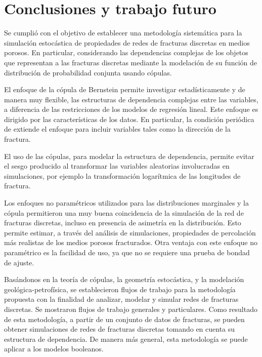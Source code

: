 
\chapter{Conclusiones y trabajo futuro}
\label{ch:conclusiones}

Se cumpli\'o con el objetivo de  establecer una metodolog\'ia sistem\'atica para la simulaci\'on estoc\'astica de propiedades de redes de fracturas discretas en medios porosos.
En particular, considerando las dependencias complejas de los objetos que representan a las fracturas discretas mediante la modelaci\'on de su funci\'on de distribuci\'on de probabilidad conjunta usando c\'opulas.

El enfoque de la c\'opula de Bernstein permite investigar estad\'isticamente y de manera muy flexible, las estructuras de dependencia complejas  entre las variables, a diferencia de las restricciones de los modelos de regresi\'on lineal. Este enfoque es dirigido por las caracter\'isticas de los datos. 
En particular, la condici\'on peri\'odica de \citeauthor{carnicero_non-parametric_2013} extiende el enfoque para incluir variables tales como la direcci\'on de la fractura.

El uso de las c\'opulas, para modelar la estructura de dependencia, permite evitar el sesgo producido al transformar las variables aleatorias involucradas en simulaciones, por ejemplo la transformaci\'on logar\'itmica de las longitudes de fractura.

Los enfoques no param\'etricos utilizados para las distribuciones marginales y la c\'opula permitieron una muy buena coincidencia de la simulaci\'on de la red de fracturas discretas, incluso en presencia de asimetr\'ia en la distribuci\'on. Esto permite estimar, a trav\'es del an\'alisis de simulaciones, propiedades de percolaci\'on m\'as realistas de los medios porosos fracturados. Otra ventaja con este enfoque no param\'etrico es la facilidad de uso, ya que no se requiere una prueba de bondad de ajuste.

Bas\'andonos en la teor\'ia de c\'opulas, la geometr\'ia estoc\'astica, y la modelaci\'on geol\'ogica-petrof\'isica, se establecieron flujos de trabajo para la metodolog\'ia propuesta con la finalidad de analizar, modelar y simular redes de fracturas discretas.
Se mostraron flujos de trabajo generales y particulares.
Como resultado de esta metodolog\'ia, a partir de un conjunto de datos de fracturas, se pueden obtener simulaciones de redes de fracturas discretas tomando en cuenta su estructura de dependencia.
De manera m\'as general, esta metodolog\'ia se puede aplicar a los modelos booleanos.

